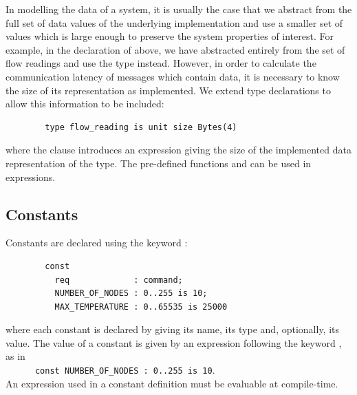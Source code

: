 In modelling the data of a system, it is usually the case that we
abstract from the full set of data values of the underlying
implementation and use a smaller set of values which is large
enough to preserve the system properties of interest. For example, in
the declaration of  above, we have abstracted
entirely from the set of flow readings and use the
 type instead. However, in order to calculate the
communication latency of messages which contain
 data, it is necessary to know the size of its
representation as implemented.  We extend type declarations to allow
this information to be included:
\begin{verbatim}
        type flow_reading is unit size Bytes(4)
\end{verbatim}
where the  clause introduces an expression giving the size
of the implemented data representation of the type. The pre-defined
functions  and  can be used in  expressions. 

\subsection{Constants}
Constants are declared using the keyword :
\begin{verbatim}
        const
          req             : command;
          NUMBER_OF_NODES : 0..255 is 10;
          MAX_TEMPERATURE : 0..65535 is 25000
\end{verbatim}
where each constant is declared by giving its name, its type and, optionally,
its value. The value of a constant is given by an expression following
the keyword , as in \\
\verb'      const NUMBER_OF_NODES : 0..255 is 10'. \\
An expression used in a constant definition must be evaluable at compile-time.

